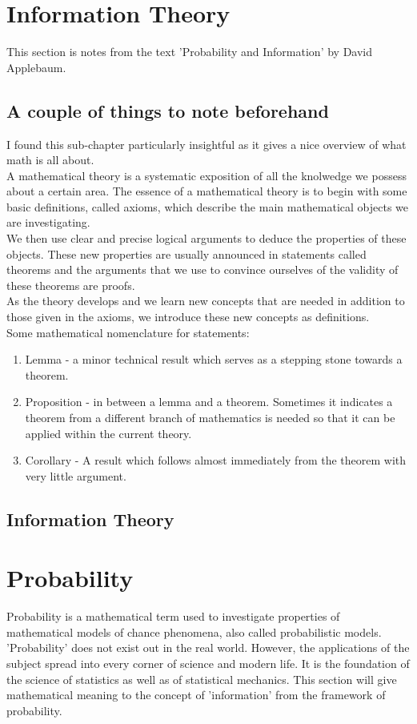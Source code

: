 \documentclass[]{article}
\begin{document}
\section{Information Theory}
This section is notes from the text 'Probability and Information' by David Applebaum.
\subsection{A couple of things to note beforehand}
I found this sub-chapter particularly insightful as it gives a nice overview of what math is all about.\\

\noindent A mathematical theory is a systematic exposition of all the knolwedge we possess about a certain area. The essence of a mathematical theory is to begin with some basic definitions, called axioms, which describe the main mathematical objects we are investigating.\\

\noindent We then use clear and precise logical arguments to deduce the properties of these objects. These new properties are usually announced in statements called theorems and the arguments that we use to convince ourselves of the validity of these theorems are proofs.\\

\noindent As the theory develops and we learn new concepts that are needed in addition to those given in the axioms, we introduce these new concepts as definitions.\\

\noindent Some mathematical nomenclature for statements:
\begin{enumerate}
    \item Lemma - a minor technical result which serves as a stepping stone towards a theorem.
    \item Proposition - in between a lemma and a theorem. Sometimes it indicates a theorem from a different branch of mathematics is needed so that it can be applied within the current theory. 
    \item Corollary - A result which follows almost immediately from the theorem with very little argument. 
\end{enumerate}

\subsection{Information Theory}


\section{Probability}
Probability is a mathematical term used to investigate properties of mathematical models of chance phenomena, also called probabilistic models. 'Probability' does not exist out in the real world. However, the applications of the subject spread into every corner of science and modern life. It is the foundation of the science of statistics as well as of statistical mechanics. This section will give mathematical meaning to the concept of 'information' from the framework of probability. 
\end{document}
